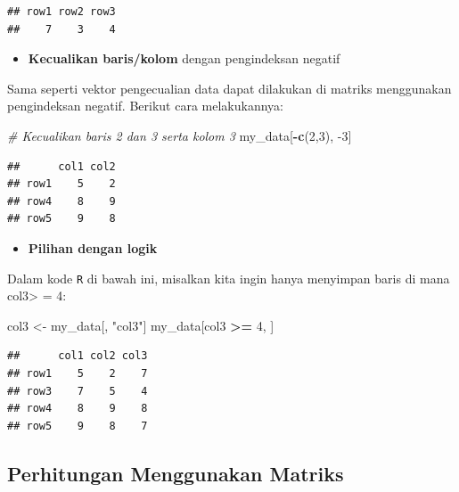 \documentclass[]{book}
\newenvironment{Shaded}{\begin{snugshade}}{\end{snugshade}}
\newcommand{\CommentTok}[1]{\textcolor[rgb]{0.56,0.35,0.01}{\textit{#1}}}
\newcommand{\DecValTok}[1]{\textcolor[rgb]{0.00,0.00,0.81}{#1}}
\newcommand{\KeywordTok}[1]{\textcolor[rgb]{0.13,0.29,0.53}{\textbf{#1}}}
\newcommand{\NormalTok}[1]{#1}
\newcommand{\OperatorTok}[1]{\textcolor[rgb]{0.81,0.36,0.00}{\textbf{#1}}}
\newcommand{\StringTok}[1]{\textcolor[rgb]{0.31,0.60,0.02}{#1}}
\providecommand{\tightlist}{%
  \setlength{\itemsep}{0pt}\setlength{\parskip}{0pt}}
\theoremstyle{definition}
\theoremstyle{definition}
\theoremstyle{definition}
\theoremstyle{remark}
\begin{document}
\begin{verbatim}
## row1 row2 row3 
##    7    3    4
\end{verbatim}

\begin{itemize}
\tightlist
\item
  \textbf{Kecualikan baris/kolom} dengan pengindeksan negatif
\end{itemize}

Sama seperti vektor pengecualian data dapat dilakukan di matriks menggunakan pengindeksan negatif. Berikut cara melakukannya:

\begin{Shaded}
\begin{Highlighting}[]
\CommentTok{# Kecualikan baris 2 dan 3 serta kolom 3}
\NormalTok{my_data[}\OperatorTok{-}\KeywordTok{c}\NormalTok{(}\DecValTok{2}\NormalTok{,}\DecValTok{3}\NormalTok{), }\DecValTok{-3}\NormalTok{]}
\end{Highlighting}
\end{Shaded}

\begin{verbatim}
##      col1 col2
## row1    5    2
## row4    8    9
## row5    9    8
\end{verbatim}

\begin{itemize}
\tightlist
\item
  \textbf{Pilihan dengan logik}
\end{itemize}

Dalam kode \texttt{R} di bawah ini, misalkan kita ingin hanya menyimpan baris di mana col3\textgreater{} = 4:

\begin{Shaded}
\begin{Highlighting}[]
\NormalTok{col3 <-}\StringTok{ }\NormalTok{my_data[, }\StringTok{"col3"}\NormalTok{]}
\NormalTok{my_data[col3 }\OperatorTok{>=}\StringTok{ }\DecValTok{4}\NormalTok{, ]}
\end{Highlighting}
\end{Shaded}

\begin{verbatim}
##      col1 col2 col3
## row1    5    2    7
## row3    7    5    4
## row4    8    9    8
## row5    9    8    7
\end{verbatim}

\hypertarget{matrixcalculation}{%
\subsection{Perhitungan Menggunakan Matriks}\label{matrixcalculation}}
\end{document}
